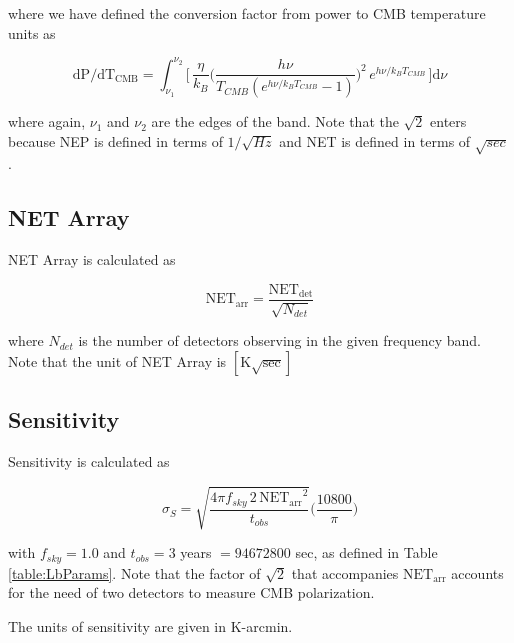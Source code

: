 \documentclass[12pt, titlepage]{article} %
\begin{document}
where we have defined the conversion factor from power to CMB temperature units as \cite{kamThesis}

\begin{equation}
	\mathrm{dP/dT_{CMB}} = \int_{\nu_1}^{\nu_{2}} \Big[ \, \frac{\eta}{k_{B}} \Big(\frac{h \nu}{T_{CMB} (e^{h \nu / k_{B} T_{CMB}} - 1)} \Big)^{2} \, e^{h \nu / k_{B} T_{CMB}} \, \Big] \mathrm{d}{\nu}
\end{equation}

where again, $\nu_{1}$ and $\nu_{2}$ are the edges of the band. Note that the $\sqrt{2}$ enters because NEP is defined in terms of $1/\sqrt{Hz}$ and NET is defined in terms of $\sqrt{sec}$.


\subsection{NET Array}

NET Array is calculated as \cite{kamThesis} 

\begin{equation}
	\mathrm{NET_{arr}} = \frac{\mathrm{NET_{det}}}{\sqrt{N_{det}}}
\end{equation}

where $N_{det}$ is the number of detectors observing in the given frequency band. Note that the unit of NET Array is $\mathrm{[K\sqrt{sec}]}$


\subsection{Sensitivity}

Sensitivity is calculated as 

\begin{equation}
	\sigma_{S} = \sqrt{\frac{4 \pi f_{sky} \, 2 \, \mathrm{NET_{arr}}^{2}}{t_{obs}}} \Big( \frac{10800}{\pi} \Big)
\end{equation}

with $f_{sky} = 1.0$ and $t_{obs} = 3$ years $ = 94672800$ sec, as defined in Table \ref{table:LbParams}. Note that the factor of $\mathrm{\sqrt{2}}$ that accompanies $\mathrm{NET_{arr}}$ accounts for the need of two detectors to measure CMB polarization. 

The units of sensitivity are given in K-arcmin.


\end{document}
